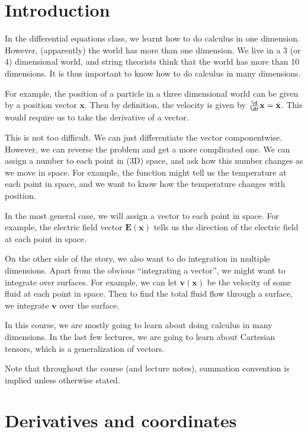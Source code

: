 \documentclass[a4paper]{article}
\begin{document}
\tableofcontents

\setcounter{section}{-1}
\section{Introduction}
In the differential equations class, we learnt how to do calculus in one dimension. However, (apparently) the world has more than one dimension. We live in a 3 (or 4) dimensional world, and string theorists think that the world has more than 10 dimensions. It is thus important to know how to do calculus in many dimensions.

For example, the position of a particle in a three dimensional world can be given by a position vector $\mathbf{x}$. Then by definition, the velocity is given by $\frac{\d}{\d t} \mathbf{x} = \dot{\mathbf{x}}$. This would require us to take the derivative of a vector.

This is not too difficult. We can just differentiate the vector componentwise. However, we can reverse the problem and get a more complicated one. We can assign a number to each point in (3D) space, and ask how this number changes as we move in space. For example, the function might tell us the temperature at each point in space, and we want to know how the temperature changes with position.

In the most general case, we will assign a vector to each point in space. For example, the electric field vector $\mathbf{E}(\mathbf{x})$ tells us the direction of the electric field at each point in space.

On the other side of the story, we also want to do integration in multiple dimensions. Apart from the obvious ``integrating a vector'', we might want to integrate over surfaces. For example, we can let $\mathbf{v}(\mathbf{x})$ be the velocity of some fluid at each point in space. Then to find the total fluid flow through a surface, we integrate $\mathbf{v}$ over the surface.

In this course, we are mostly going to learn about doing calculus in many dimensions. In the last few lectures, we are going to learn about Cartesian tensors, which is a generalization of vectors.

Note that throughout the course (and lecture notes), summation convention is implied unless otherwise stated.

\section{Derivatives and coordinates}
\end{document}
